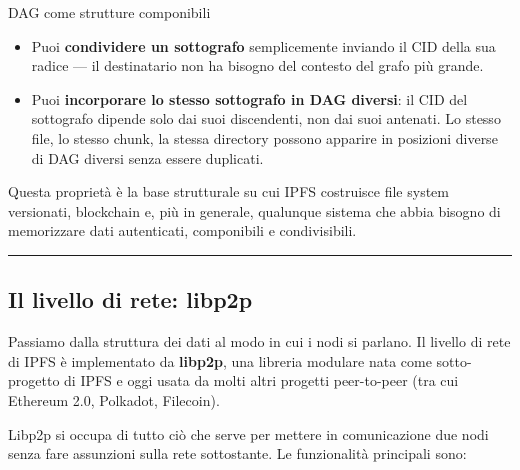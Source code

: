 \documentclass[
  italian,
  openany]{book}
\providecommand{\tightlist}{%
  \setlength{\itemsep}{0pt}\setlength{\parskip}{0pt}}
\begin{document}
\begin{callouttip}{DAG come strutture componibili}

\begin{itemize}
\tightlist
\item
  Puoi \textbf{condividere un sottografo} semplicemente inviando il CID
  della sua radice --- il destinatario non ha bisogno del contesto del
  grafo più grande.
\item
  Puoi \textbf{incorporare lo stesso sottografo in DAG diversi}: il CID
  del sottografo dipende solo dai suoi discendenti, non dai suoi
  antenati. Lo stesso file, lo stesso chunk, la stessa directory possono
  apparire in posizioni diverse di DAG diversi senza essere duplicati.
\end{itemize}

\end{callouttip}

Questa proprietà è la base strutturale su cui IPFS costruisce file
system versionati, blockchain e, più in generale, qualunque sistema che
abbia bisogno di memorizzare dati autenticati, componibili e
condivisibili.

\begin{center}\rule{0.5\linewidth}{0.5pt}\end{center}

\subsection{Il livello di rete: libp2p}\label{il-livello-di-rete-libp2p}

Passiamo dalla struttura dei dati al modo in cui i nodi si parlano. Il
livello di rete di IPFS è implementato da \textbf{libp2p}, una libreria
modulare nata come sotto-progetto di IPFS e oggi usata da molti altri
progetti peer-to-peer (tra cui Ethereum 2.0, Polkadot, Filecoin).

Libp2p si occupa di tutto ciò che serve per mettere in comunicazione due
nodi senza fare assunzioni sulla rete sottostante. Le funzionalità
principali sono:
\end{document}
